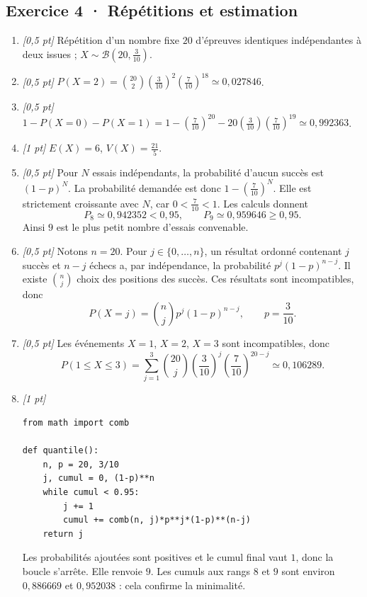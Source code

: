 \subsection*{Exercice 4 · Répétitions et estimation}\begin{enumerate}

\item \textit{[0{,}5 pt]} Répétition d'un nombre fixe $20$ d'épreuves identiques indépendantes à deux issues ; $X\sim\mathcal B(20,\frac{3}{10})$.

\item \textit{[0{,}5 pt]} $P(X=2)=\binom{20}2(\frac{3}{10})^2(\frac{7}{10})^{18}\simeq0{,}027846$.

\item \textit{[0{,}5 pt]} $1-P(X=0)-P(X=1)=1-(\frac{7}{10})^{20}-20(\frac{3}{10})(\frac{7}{10})^{19}\simeq0{,}992363$.

\item \textit{[1 pt]} $E(X)=6$, $V(X)=\frac{21}{5}$.

\item \textit{[0{,}5 pt]} Pour $N$ essais indépendants, la probabilité d'aucun succès est $(1-p)^N$. La probabilité demandée est donc $1-(\frac{7}{10})^N$. Elle est strictement croissante avec $N$, car $0<\frac{7}{10}<1$. Les calculs donnent
\[P_{8}\simeq0{,}942352<0{,}95,\qquad P_{9}\simeq0{,}959646\ge0{,}95.\]
Ainsi $9$ est le plus petit nombre d'essais convenable.

\item \textit{[0{,}5 pt]} Notons $n=20$. Pour $j\in\{0,\ldots,n\}$, un résultat ordonné contenant $j$ succès et $n-j$ échecs a, par indépendance, la probabilité $p^j(1-p)^{n-j}$. Il existe $\binom nj$ choix des positions des succès. Ces résultats sont incompatibles, donc
\[P(X=j)=\binom nj p^j(1-p)^{n-j},\qquad p=\frac{3}{10}.\]

\item \textit{[0{,}5 pt]} Les événements $X=1$, $X=2$, $X=3$ sont incompatibles, donc
\[P(1\le X\le3)=\sum_{j=1}^3\binom{20}j(\frac{3}{10})^j(\frac{7}{10})^{20-j}\simeq0{,}106289.\]


\item \textit{[1 pt]} 
\begin{lstlisting}
from math import comb

def quantile():
    n, p = 20, 3/10
    j, cumul = 0, (1-p)**n
    while cumul < 0.95:
        j += 1
        cumul += comb(n, j)*p**j*(1-p)**(n-j)
    return j
\end{lstlisting}
Les probabilités ajoutées sont positives et le cumul final vaut $1$, donc la boucle s'arrête. Elle renvoie $9$. Les cumuls aux rangs $8$ et $9$ sont environ $0{,}886669$ et $0{,}952038$ : cela confirme la minimalité.

\end{enumerate}

